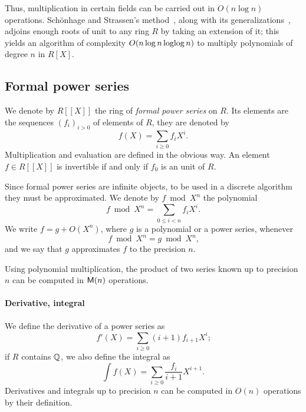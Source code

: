   Thus,
multiplication in certain fields can be carried out in $O(n\log n)$
operations. Schönhage and Strassen's method~\cite{schonage+strassen},
along with its generalizations~\cite{schonhage77,cantor+kaltofen91},
adjoins enough roots of unit to any ring $R$ by taking an extension of
it; this yields an algorithm of complexity $O(n\log n\operatorname{loglog} n)$ to
multiply polynomials of degree $n$ in $R[X]$.

\subsection{Formal power series}
\label{sec:formal-power-series}
We denote by $R[[X]]$ the ring of
\emph{formal power series} on $R$. Its
elements are the sequences $(f_i)_{i>0}$ of elements of $R$, they are
denoted by
\begin{equation}
  \label{eq:197}
  f(X) = \sum_{i\ge0}f_iX^i
  \text{.}
\end{equation}
Multiplication and evaluation are defined in the obvious way. An
element $f\in R[[X]]$ is invertible if and only if $f_0$ is an unit
of $R$.

Since formal power series are infinite objects, to be used in a
discrete algorithm they must be approximated. We denote by $f\bmod
X^n$ the polynomial
\begin{equation}
  \label{eq:198}
  f\bmod X^n = \sum_{0\le i < n}f_iX^i
  \text{.}
\end{equation}
We write $f = g + O(X^n)$, where $g$ is a polynomial or a power
series, whenever
\[f\bmod X^n=g\bmod X^n\text{,}\] and we say that $g$ approximates $f$
to the precision $n$.

Using polynomial multiplication, the product of two series known up to
precision $n$ can be computed in $\mathsf{M}(n)$ operations.

\paragraph{Derivative, integral}
\label{sec:derivative-integral}
We define the derivative of a
power series as
\begin{equation}
  f'(X) = \sum_{i\ge0}(i+1)f_{i+1}X^i\text{;}
\end{equation}
if $R$ contains $\mathbb{Q}$, we also define the
integral as
\begin{equation}
  \label{eq:200}
  \int f(X) = \sum_{i\ge0}\frac{f_i}{i+1}X^{i+1}\text{.}
\end{equation}
Derivatives and integrals up to precision $n$ can be computed in
$O(n)$ operations by their definition.

